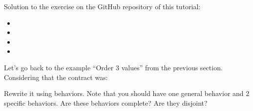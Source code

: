 \begin{Information}
  Solution to the exercise on the GitHub repository of this tutorial:
  \begin{itemize}
    \item {}
    \item {}
    \item {}
    \item {}
  \end{itemize}
\end{Information}




Let's go back to the example ``Order 3 values'' from the previous section. Considering
that the contract was:




Rewrite it using behaviors. Note that you should have one general behavior
and 2 specific behaviors. Are these behaviors complete? Are they disjoint?


